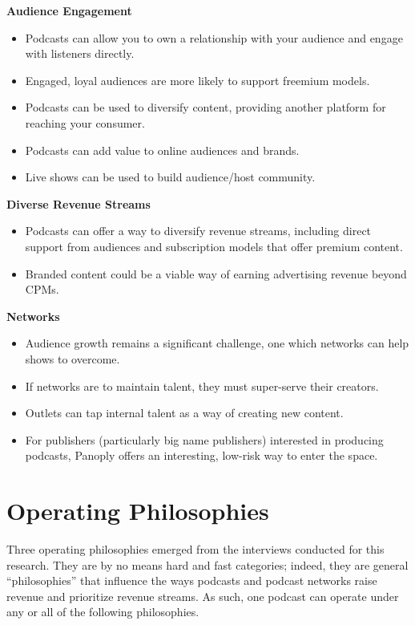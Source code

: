 \documentclass[notoc, symmetric, nobib, nols]{towcenter-guideto-book}
\begin{document}
\textbf{Audience Engagement}

\begin{itemize}
\item Podcasts can allow you to own a relationship with your audience and engage with listeners directly. 
\item Engaged, loyal audiences are more likely to support freemium models.
\item Podcasts can be used to diversify content, providing another platform for reaching your consumer.
\item Podcasts can add value to online audiences and brands.
\item Live shows can be used to build audience/host community.
\end{itemize}

\textbf{Diverse Revenue Streams}

\begin{itemize}
\item Podcasts can offer a way to diversify revenue streams, including direct support from audiences and subscription models that offer premium content. 
\item Branded content could be a viable way of earning advertising revenue beyond CPMs.
\end{itemize}

\textbf{Networks}

\begin{itemize}
\item Audience growth remains a significant challenge, one which networks can help shows to overcome.
\item If networks are to maintain talent, they must super-serve their creators.
\item Outlets can tap internal talent as a way of creating new content.
\item For publishers (particularly big name publishers) interested in producing podcasts, Panoply offers an interesting, low-risk way to enter the space.
\end{itemize}

\chapter{Operating Philosophies} 

Three operating philosophies emerged from the interviews conducted for this research. They are by no means hard and fast categories; indeed, they are general ``philosophies'' that influence the ways podcasts and podcast networks raise revenue and prioritize revenue streams. As such, one podcast can operate under any or all of the following philosophies.
\end{document}

